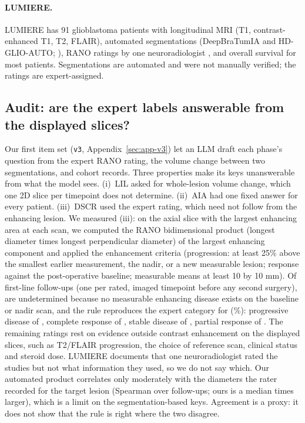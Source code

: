 \documentclass[11pt]{article}
\begin{document}
\paragraph{LUMIERE.} LUMIERE \citep{suter2022lumiere} has 91 glioblastoma patients with longitudinal MRI (T1, contrast-enhanced T1, T2, FLAIR), automated segmentations (DeepBraTumIA and HD-GLIO-AUTO; \citealp{suter2022lumiere, kickingereder2019automated}), RANO ratings by one neuroradiologist \citep{wen2010updated}, and overall survival for most patients. Segmentations are automated and were not manually verified; the ratings are expert-assigned.

\subsection{Audit: are the expert labels answerable from the displayed slices?}
\label{sec:audit}

Our first item set (\texttt{v3}, Appendix~\ref{sec:app-v3}) let an LLM draft each phase's question from the expert RANO rating, the volume change between two segmentations, and cohort records. Three properties make its keys unanswerable from what the model sees. (i)~LIL asked for whole-lesion volume change, which one 2D slice per timepoint does not determine. (ii)~AIA had one fixed answer for every patient. (iii)~DSCR used the expert rating, which need not follow from the enhancing lesion. We measured (iii): on the axial slice with the largest enhancing area at each scan, we computed the RANO bidimensional product (longest diameter times longest perpendicular diameter) of the largest enhancing component and applied the enhancement criteria (progression: at least 25\% above the smallest earlier measurement, the nadir, or a new measurable lesion; response against the post-operative baseline; measurable means at least 10 by 10 mm). Of \vfourFollowups{} first-line follow-ups (one per rated, imaged timepoint before any second surgery), \vfourUndetermined{} are undetermined because no measurable enhancing disease exists on the baseline or nadir scan, and the rule reproduces the expert category for \vfourConcordant{} (\vfourConcordantPct{}\%): progressive disease \vfourExpPDSame{} of \vfourExpPDN{}, complete response \vfourExpCRSame{} of \vfourExpCRN{}, stable disease \vfourExpSDSame{} of \vfourExpSDN{}, partial response \vfourExpPRSame{} of \vfourExpPRN{}. The remaining ratings rest on evidence outside contrast enhancement on the displayed slices, such as T2/FLAIR progression, the choice of reference scan, clinical status and steroid dose. LUMIERE documents that one neuroradiologist rated the studies but not what information they used, so we do not say which. Our automated product correlates only moderately with the diameters the rater recorded for the target lesion (Spearman \vfourBpRho{} over \vfourBpN{} follow-ups; ours is a median \vfourBpRatio{} times larger), which is a limit on the segmentation-based keys. Agreement is a proxy: it does not show that the rule is right where the two disagree.
\end{document}
